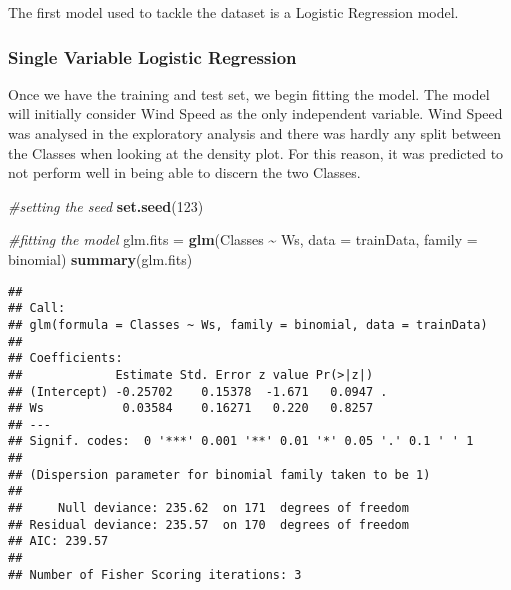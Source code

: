\documentclass[
]{article}
\newenvironment{Shaded}{\begin{snugshade}}{\end{snugshade}}
\newcommand{\AttributeTok}[1]{\textcolor[rgb]{0.13,0.29,0.53}{#1}}
\newcommand{\CommentTok}[1]{\textcolor[rgb]{0.56,0.35,0.01}{\textit{#1}}}
\newcommand{\DecValTok}[1]{\textcolor[rgb]{0.00,0.00,0.81}{#1}}
\newcommand{\FunctionTok}[1]{\textcolor[rgb]{0.13,0.29,0.53}{\textbf{#1}}}
\newcommand{\NormalTok}[1]{#1}
\newcommand{\OtherTok}[1]{\textcolor[rgb]{0.56,0.35,0.01}{#1}}
\newcommand{\SpecialCharTok}[1]{\textcolor[rgb]{0.81,0.36,0.00}{\textbf{#1}}}
\newcommand{\StringTok}[1]{\textcolor[rgb]{0.31,0.60,0.02}{#1}}
\begin{document}
The first model used to tackle the dataset is a Logistic Regression
model.

\subsubsection{Single Variable Logistic
Regression}\label{single-variable-logistic-regression}

Once we have the training and test set, we begin fitting the model. The
model will initially consider Wind Speed as the only independent
variable. Wind Speed was analysed in the exploratory analysis and there
was hardly any split between the Classes when looking at the density
plot. For this reason, it was predicted to not perform well in being
able to discern the two Classes.

\begin{Shaded}
\begin{Highlighting}[]
\CommentTok{\#setting the seed}
\FunctionTok{set.seed}\NormalTok{(}\DecValTok{123}\NormalTok{)}

\CommentTok{\#fitting the model}
\NormalTok{glm.fits }\OtherTok{=} \FunctionTok{glm}\NormalTok{(Classes }\SpecialCharTok{\textasciitilde{}}\NormalTok{ Ws, }\AttributeTok{data =}\NormalTok{ trainData, }\AttributeTok{family =}\NormalTok{ binomial)}
\FunctionTok{summary}\NormalTok{(glm.fits)}
\end{Highlighting}
\end{Shaded}

\begin{verbatim}
## 
## Call:
## glm(formula = Classes ~ Ws, family = binomial, data = trainData)
## 
## Coefficients:
##             Estimate Std. Error z value Pr(>|z|)  
## (Intercept) -0.25702    0.15378  -1.671   0.0947 .
## Ws           0.03584    0.16271   0.220   0.8257  
## ---
## Signif. codes:  0 '***' 0.001 '**' 0.01 '*' 0.05 '.' 0.1 ' ' 1
## 
## (Dispersion parameter for binomial family taken to be 1)
## 
##     Null deviance: 235.62  on 171  degrees of freedom
## Residual deviance: 235.57  on 170  degrees of freedom
## AIC: 239.57
## 
## Number of Fisher Scoring iterations: 3
\end{verbatim}

\begin{Shaded}
\end{Shaded}
\end{document}
